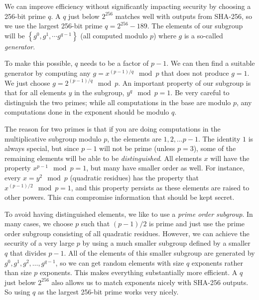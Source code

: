 We can improve efficiency without significantly impacting security by
choosing a 256-bit prime $q$. A $q$ just below $2^{256}$ matches well
with outputs from SHA-256, so we use the largest 256-bit prime
$q=2^{256}-189$. The elements of our subgroup will be
$\left\{g^0, g^1, \cdots g^{q-1}\right\}$ (all computed modulo $p$) where $g$ is
a so-called {\em generator}.

To make this possible, $q$ needs to be a factor of $p-1$.  We can then find a
suitable generator by computing any $g=x^{(p-1)/q} \mod p$ that does
not produce $g=1$.  We just
choose $g=2^{(p-1)/q} \mod p$.  An important property of our subgroup is that for all
elements $y$ in the subgroup, $y^q \mod p = 1$.  Be very careful to distinguish the two
primes; while all computations in the base are modulo $p$, any
computations done in the exponent should be modulo $q$.

The reason for two primes is that if you are doing computations in the
multiplicative subgroup modulo $p$, the elements are ${1,2,\ldots p-1}$. The
identity $1$ is always special, but since $p-1$ will not be prime (unless
$p=3$), some of the remaining elements will be able to be {\em distinguished}.
All elements $x$ will have the property $x^{p-1}\mod p = 1$, but many have
smaller order as well. For instance, every $x=y^2\mod p$ (quadratic
residues) has the property that $x^{(p-1)/2}\mod p = 1$, and this
property persists as these elements are raised to other powers. This
can compromise information that should be kept secret.
 

To avoid having distinguished elements, we like to use a {\em prime order
subgroup}. In many cases, we choose $p$ such that $(p-1)/2$ is prime and
just use the prime order subgroup consisting of all quadratic
residues. However, we can achieve the security of a very large $p$ by
using a much smaller subgroup defined by a smaller $q$ that divides
$p-1$. All of the elements of this smaller subgroup are generated by
$g^0,g^1, g^2,\ldots, g^{q-1}$, so we can get random elements with size $q$
exponents rather than size $p$ exponents. This makes everything
substantially more efficient. A $q$ just below $2^{256}$ also allows us to
match exponents nicely with SHA-256 outputs. So using $q$ as the largest
256-bit prime works very nicely.
\fi
 

